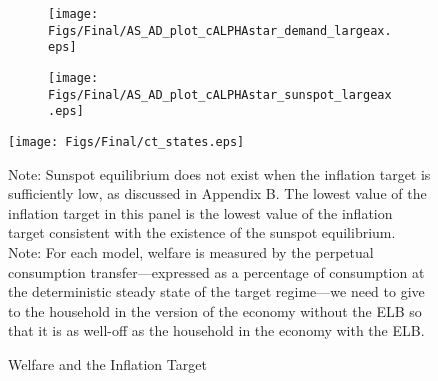 \documentclass[11pt]{article}
\begin{document}
	\begin{figure}[t]
		\caption{AD and AS Curves in the Crisis State and in the Deflationary Regime} \label{fig:ASAD}
		\begin{center}
			\begin{subfigure}[b]{0.4\textwidth}
				\centering
				\texttt{[image: Figs/Final/AS\_AD\_plot\_cALPHAstar\_demand\_largeax.eps]}
			\end{subfigure}
		    \hspace{0.5cm}
			\begin{subfigure}[b]{0.4\textwidth}
				\centering
				\texttt{[image: Figs/Final/AS\_AD\_plot\_cALPHAstar\_sunspot\_largeax.eps]}
			\end{subfigure}
		\end{center}
	\end{figure}

	\begin{figure}[!h]
		\begin{center}
			\caption{Welfare and the Inflation Target\label{fig:Welfare_Stylized}}
			\texttt{[image: Figs/Final/ct\_states.eps]}\\
		\end{center}
		\footnotesize{Note: Sunspot equilibrium does not exist when the inflation target is sufficiently low, as discussed in Appendix B. The lowest value of the inflation target in this panel is the lowest value of the inflation target consistent with the existence of the sunspot equilibrium.} \\
		\footnotesize{Note: For each model, welfare is measured by the perpetual consumption transfer---expressed as a percentage of consumption at the deterministic steady state of the target regime---we need to give to the household in the version of the economy without the ELB so that it is as well-off as the household in the economy with the ELB.}

	\end{figure}
\end{document}
